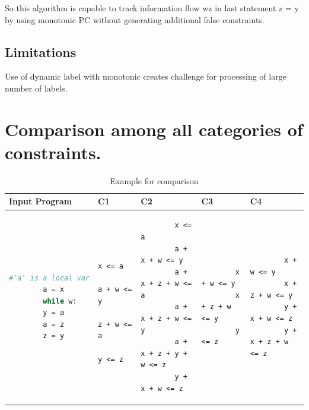 So this algorithm is capable to track information flow w\marr z in last statement z = y by using monotonic PC without generating additional false constraints. 
\subsection{Limitations}
Use of dynamic label with monotonic creates challenge for processing of large number of labels.  
\section{Comparison among all categories of constraints.}
\label{ch:comp}
\begin{table}
	\hspace{-2cm}
	\begin{tabular}{|l|l|l|l|l|}
		\hline
		Input Program  &  C1 & C2 & C3 & C4 \\
		\hline
		\begin{lstlisting}[language=Python]
		#'a' is a local var
		a = x
		while w:
		y = a
		a = z
		z = y
		\end{lstlisting}&
		\begin{lstlisting}
		x <= a
		a + w <= y
		z + w <= a
		y <= z
		\end{lstlisting}&
		\begin{lstlisting}
		x <= a
		a + x + w <= y
		a + x + z + w <= a
		a + x + z + w <= y
		a + x + z + y + w <= z
		y + x + w <= z
		\end{lstlisting}&
		\begin{lstlisting}
		x + w <= y
		x + z + w <= y
		y <= z	
		\end{lstlisting}&
		\begin{lstlisting}
		x + w <= y
		x + z + w <= y
		y + x + w <= z
		y + x + z + w <= z	
		\end{lstlisting}\\
		\hline
		
	\end{tabular}
	\caption{Example for comparison}
	\label{tbl:compex}
\end{table}


